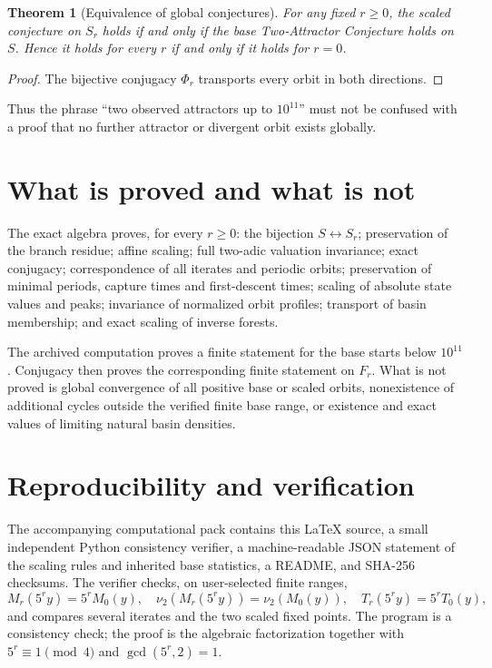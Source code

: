 \documentclass[11pt]{article}
\newtheorem{theorem}{Theorem}
\theoremstyle{remark}\newtheorem{remark}{Remark}
\begin{document}
\begin{theorem}[Equivalence of global conjectures]
For any fixed $r\ge0$, the scaled conjecture on $S_r$ holds if and only if the base Two-Attractor Conjecture holds on $S$. Hence it holds for every $r$ if and only if it holds for $r=0$.
\end{theorem}
\begin{proof}
The bijective conjugacy $\Phi_r$ transports every orbit in both directions.
\end{proof}
Thus the phrase ``two observed attractors up to $10^{11}$'' must not be confused with a proof that no further attractor or divergent orbit exists globally.

\section{What is proved and what is not}
The exact algebra proves, for every $r\ge0$: the bijection $S\leftrightarrow S_r$; preservation of the branch residue; affine scaling; full two-adic valuation invariance; exact conjugacy; correspondence of all iterates and periodic orbits; preservation of minimal periods, capture times and first-descent times; scaling of absolute state values and peaks; invariance of normalized orbit profiles; transport of basin membership; and exact scaling of inverse forests.

The archived computation proves a finite statement for the base starts below $10^{11}$. Conjugacy then proves the corresponding finite statement on $F_r$. What is not proved is global convergence of all positive base or scaled orbits, nonexistence of additional cycles outside the verified finite base range, or existence and exact values of limiting natural basin densities.

\section{Reproducibility and verification}
The accompanying computational pack contains this \LaTeX{} source, a small independent Python consistency verifier, a machine-readable JSON statement of the scaling rules and inherited base statistics, a README, and SHA-256 checksums. The verifier checks, on user-selected finite ranges,
\[
M_r(5^ry)=5^rM_0(y),\quad
\nu_2(M_r(5^ry))=\nu_2(M_0(y)),\quad
T_r(5^ry)=5^rT_0(y),
\]
and compares several iterates and the two scaled fixed points. The program is a consistency check; the proof is the algebraic factorization together with $5^r\equiv1\pmod4$ and $\gcd(5^r,2)=1$.
\end{document}
